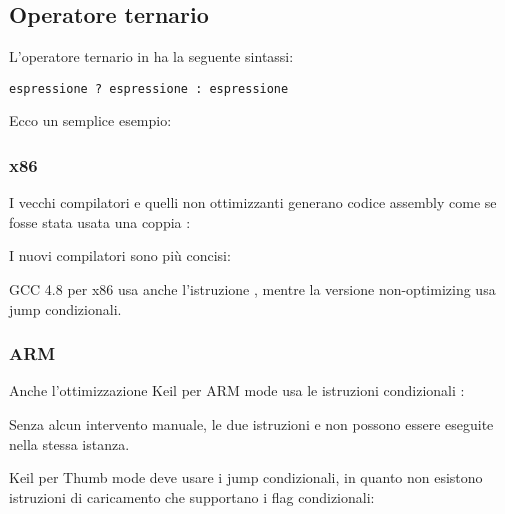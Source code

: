 \subsection{Operatore ternario}
\label{chap:cond}

L'operatore ternario in \CCpp ha la seguente sintassi:

\begin{lstlisting}
espressione ? espressione : espressione
\end{lstlisting}

Ecco un semplice esempio:



\subsubsection{x86}

I vecchi compilatori e quelli non ottimizzanti generano codice assembly come se fosse stata usata una coppia :





I nuovi compilatori sono più concisi:



\Optimizing GCC 4.8 per x86 usa anche l'istruzione , mentre la versione non-optimizing usa jump condizionali.

\subsubsection{ARM}

Anche l'ottimizzazione Keil per ARM mode usa le istruzioni condizionali :



Senza alcun intervento manuale, le due istruzioni  e  non possono essere eseguite nella stessa istanza.

\Optimizing Keil per Thumb mode deve usare i jump condizionali, in quanto non esistono istruzioni di caricamento che supportano i flag condizionali:

